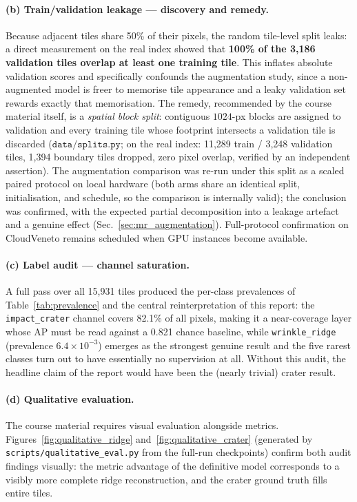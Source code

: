 \documentclass{aa}
\begin{document}
\paragraph{(b) Train/validation leakage --- discovery and remedy.}
Because adjacent tiles share 50\% of their pixels, the random tile-level split leaks: a direct measurement on the real index showed that \textbf{100\% of the 3{,}186 validation tiles overlap at least one training tile}. This inflates absolute validation scores and specifically confounds the augmentation study, since a non-augmented model is freer to memorise tile appearance and a leaky validation set rewards exactly that memorisation. The remedy, recommended by the course material itself, is a \emph{spatial block split}: contiguous $1024$-px blocks are assigned to validation and every training tile whose footprint intersects a validation tile is discarded ($\texttt{data/splits.py}$; on the real index: 11{,}289 train / 3{,}248 validation tiles, 1{,}394 boundary tiles dropped, zero pixel overlap, verified by an independent assertion). The augmentation comparison was re-run under this split as a scaled paired protocol on local hardware (both arms share an identical split, initialisation, and schedule, so the comparison is internally valid); the conclusion was confirmed, with the expected partial decomposition into a leakage artefact and a genuine effect (Sec.~\ref{sec:mr_augmentation}). Full-protocol confirmation on CloudVeneto remains scheduled when GPU instances become available.

\paragraph{(c) Label audit --- channel saturation.}
A full pass over all 15{,}931 tiles produced the per-class prevalences of Table~\ref{tab:prevalence} and the central reinterpretation of this report: the \texttt{impact\_crater} channel covers 82.1\% of all pixels, making it a near-coverage layer whose AP must be read against a 0.821 chance baseline, while \texttt{wrinkle\_ridge} (prevalence $6.4\times10^{-3}$) emerges as the strongest genuine result and the five rarest classes turn out to have essentially no supervision at all. Without this audit, the headline claim of the report would have been the (nearly trivial) crater result.

\paragraph{(d) Qualitative evaluation.}
The course material requires visual evaluation alongside metrics. Figures~\ref{fig:qualitative_ridge} and~\ref{fig:qualitative_crater} (generated by \texttt{scripts/qualitative\_eval.py} from the full-run checkpoints) confirm both audit findings visually: the metric advantage of the definitive model corresponds to a visibly more complete ridge reconstruction, and the crater ground truth fills entire tiles.
\end{document}
